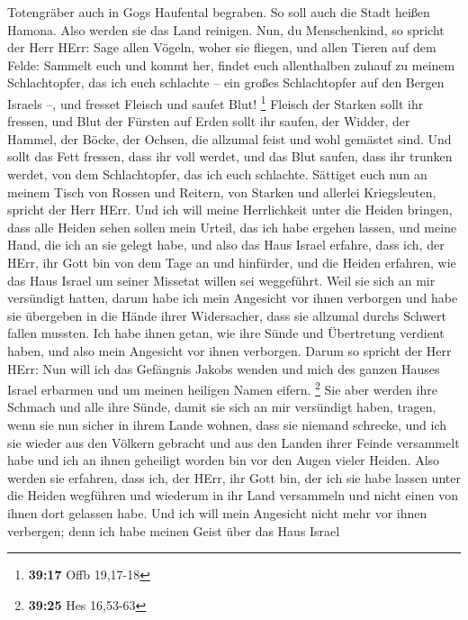 Totengräber auch in Gogs Haufental begraben.  So soll auch
die Stadt heißen Hamona. Also werden sie das Land reinigen.
 Nun, du Menschenkind, so spricht der Herr HErr: Sage allen
Vögeln, woher sie fliegen, und allen Tieren auf dem Felde: Sammelt euch
und kommt her, findet euch allenthalben zuhauf zu meinem Schlachtopfer,
das ich euch schlachte -- ein großes Schlachtopfer auf den Bergen
Israels --, und fresset Fleisch und saufet Blut! \footnote{\textbf{39:17}
  Offb 19,17-18}  Fleisch der Starken sollt ihr fressen,
und Blut der Fürsten auf Erden sollt ihr saufen, der Widder, der Hammel,
der Böcke, der Ochsen, die allzumal feist und wohl gemästet sind.
 Und sollt das Fett fressen, dass ihr voll werdet, und das
Blut saufen, dass ihr trunken werdet, von dem Schlachtopfer, das ich
euch schlachte.  Sättiget euch nun an meinem Tisch von
Rossen und Reitern, von Starken und allerlei Kriegsleuten, spricht der
Herr HErr.  Und ich will meine Herrlichkeit unter die
Heiden bringen, dass alle Heiden sehen sollen mein Urteil, das ich habe
ergehen lassen, und meine Hand, die ich an sie gelegt habe,
 und also das Haus Israel erfahre, dass ich, der HErr, ihr
Gott bin von dem Tage an und hinfürder,  und die Heiden
erfahren, wie das Haus Israel um seiner Missetat willen sei weggeführt.
Weil sie sich an mir versündigt hatten, darum habe ich mein Angesicht
vor ihnen verborgen und habe sie übergeben in die Hände ihrer
Widersacher, dass sie allzumal durchs Schwert fallen mussten.
 Ich habe ihnen getan, wie ihre Sünde und Übertretung
verdient haben, und also mein Angesicht vor ihnen verborgen.
 Darum so spricht der Herr HErr: Nun will ich das Gefängnis
Jakobs wenden und mich des ganzen Hauses Israel erbarmen und um meinen
heiligen Namen eifern. \footnote{\textbf{39:25} Hes 16,53-63}
 Sie aber werden ihre Schmach und alle ihre Sünde, damit
sie sich an mir versündigt haben, tragen, wenn sie nun sicher in ihrem
Lande wohnen, dass sie niemand schrecke,  und ich sie
wieder aus den Völkern gebracht und aus den Landen ihrer Feinde
versammelt habe und ich an ihnen geheiligt worden bin vor den Augen
vieler Heiden.  Also werden sie erfahren, dass ich, der
HErr, ihr Gott bin, der ich sie habe lassen unter die Heiden wegführen
und wiederum in ihr Land versammeln und nicht einen von ihnen dort
gelassen habe.  Und ich will mein Angesicht nicht mehr vor
ihnen verbergen; denn ich habe meinen Geist über das Haus Israel
